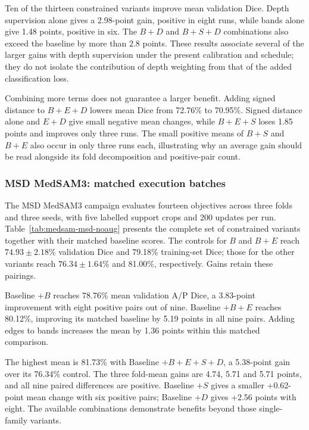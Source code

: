 \documentclass[12pt,a4paper]{article}
\begin{document}
Ten of the thirteen constrained variants improve mean validation Dice.
Depth supervision alone gives a 2.98-point gain, positive in eight
runs, while bands alone give 1.48 points, positive in six. The
$B+D$ and $B+S+D$ combinations also exceed the baseline by more
than 2.8 points. These results associate several of the larger gains
with depth supervision under the present calibration and schedule;
they do not isolate the contribution of depth weighting from that
of the added classification loss.

Combining more terms does not guarantee a larger benefit. Adding
signed distance to $B+E+D$ lowers mean Dice from 72.76\% to
70.95\%. Signed distance alone and $E+D$ give small negative
mean changes, while $B+E+S$ loses 1.85 points and improves only
three runs. The small positive means of $B+S$ and $B+E$ also
occur in only three runs each, illustrating why an average gain
should be read alongside its fold decomposition and positive-pair count.

\subsubsection*{MSD MedSAM3: matched execution batches}

The MSD MedSAM3 campaign evaluates fourteen objectives across three
folds and three seeds, with five labelled support crops and 200 updates
per run. Table~\ref{tab:medsam-msd-noaug} presents the complete set of
constrained variants together with their matched baseline scores.
The controls for $B$ and $B+E$ reach $74.93\pm2.18$\% validation Dice
and 79.18\% training-set Dice; those for the other variants reach
$76.34\pm1.64$\% and 81.00\%, respectively. Gains retain these pairings.


Baseline $+B$ reaches 78.76\% mean validation A/P Dice, a 3.83-point improvement
with eight positive pairs out of nine. Baseline $+B+E$ reaches 80.12\%,
improving its matched baseline by 5.19 points in all nine pairs.
Adding edges to bands increases the mean by 1.36 points within this
matched comparison.

The highest mean is 81.73\% with Baseline $+B+E+S+D$, a 5.38-point
gain over its 76.34\% control. The three fold-mean gains are 4.74,
5.71 and 5.71 points, and all nine paired differences are positive.
Baseline $+S$ gives a smaller +0.62-point mean change with six positive
pairs; Baseline $+D$ gives +2.56 points with eight. The available
combinations demonstrate benefits beyond those single-family variants.
\end{document}
